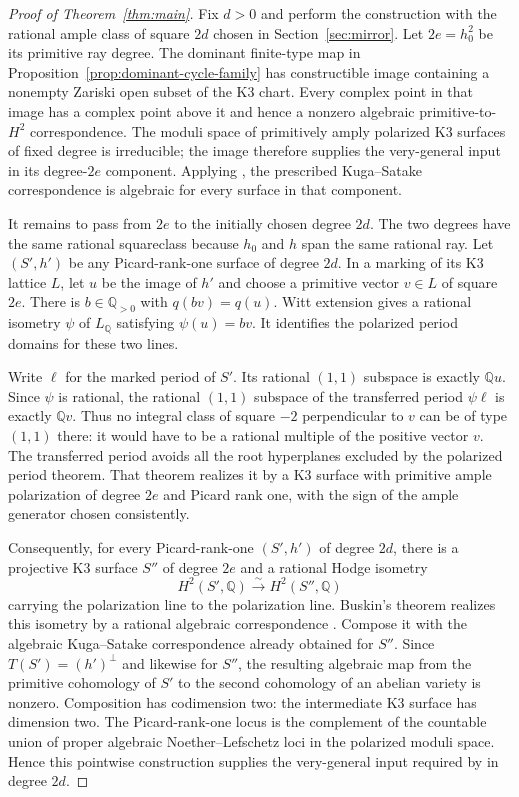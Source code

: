 \documentclass[11pt]{article}
\numberwithin{equation}{section}
\theoremstyle{definition}
\theoremstyle{remark}
\newcommand{\Q}{\mathbb Q}
\begin{document}
\begin{proof}[Proof of Theorem~\ref{thm:main}]
Fix $d>0$ and perform the construction with the rational ample
class of square $2d$ chosen in Section~\ref{sec:mirror}.
Let $2e=h_0^2$ be its primitive ray degree. The dominant finite-type
map in Proposition~\ref{prop:dominant-cycle-family} has constructible
image containing a nonempty Zariski open subset of the K3 chart.
Every complex point in that image has a complex point above it
and hence a nonzero algebraic primitive-to-$H^2$ correspondence.
The moduli space of primitively amply polarized K3 surfaces of
fixed degree is irreducible; the image therefore supplies the
very-general input in its degree-$2e$ component. Applying
\cite[Theorems~1.1--1.2]{R}, the prescribed Kuga--Satake
correspondence is algebraic for every surface in that component.

It remains to pass from $2e$ to the initially chosen degree $2d$.
The two degrees have the same rational squareclass because $h_0$
and $h$ span the same rational ray. Let $(S',h')$ be any
Picard-rank-one surface of degree $2d$. In a marking of its K3
lattice $L$, let $u$ be the image of $h'$ and choose a primitive
vector $v\in L$ of square $2e$.
There is $b\in\Q_{>0}$ with $q(bv)=q(u)$. Witt extension gives
a rational isometry $\psi$ of $L_\Q$ satisfying $\psi(u)=bv$.
It identifies the polarized period domains for these two lines.

Write $\ell$ for the marked period of $S'$. Its rational $(1,1)$ subspace is
exactly $\Q u$. Since $\psi$ is rational, the rational $(1,1)$
subspace of the transferred period $\psi\ell$ is exactly
$\Q v$. Thus no integral class of square $-2$ perpendicular to
$v$ can be of type $(1,1)$ there: it would have to be a rational
multiple of the positive vector $v$. The transferred period avoids
all the root hyperplanes excluded by the polarized period theorem.
That theorem realizes it by a K3 surface with primitive ample
polarization of degree $2e$ and Picard rank one, with the sign of
the ample generator chosen consistently.

Consequently, for every Picard-rank-one $(S',h')$ of degree $2d$,
there is a
projective K3 surface $S''$ of degree $2e$ and a rational Hodge
isometry
\[
 H^2(S',\Q)\xrightarrow{\sim}H^2(S'',\Q)
\]
carrying the polarization line to the polarization line.
Buskin's theorem realizes this isometry by a rational algebraic
correspondence \cite[Theorem~1.1]{Deformation:Buskin}.
Compose it with the algebraic Kuga--Satake correspondence already
obtained for $S''$. Since $T(S')=(h')^\perp$ and likewise for
$S''$, the resulting algebraic map from the primitive cohomology
of $S'$ to the second cohomology of an abelian variety is nonzero.
Composition has codimension two: the intermediate K3 surface has
dimension two. The Picard-rank-one locus is the complement of the
countable union of proper algebraic Noether--Lefschetz loci in the
polarized moduli space. Hence this pointwise construction supplies
the very-general input required by
\cite[Theorem~1.2]{R} in degree $2d$.


\end{proof}
\end{document}
